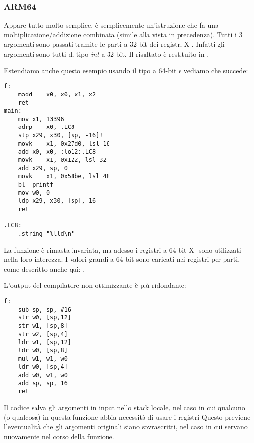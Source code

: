 \subsubsection{ARM64}


Appare tutto molto semplice.
 è semplicemente un'istruzione che fa una moltiplicazione/addizione combinata (simile alla  vista in precedenza).
Tutti i 3 argomenti sono passati tramite le parti a 32-bit dei registri X-.
Infatti gli argomenti sono tutti di tipo \emph{int} a 32-bit.
Il risultato è restituito in .



Estendiamo anche questo esempio usando il tipo  a 64-bit e vediamo che succede:



\begin{lstlisting}[style=customasmARM]
f:
	madd	x0, x0, x1, x2
	ret
main:
	mov	x1, 13396
	adrp	x0, .LC8
	stp	x29, x30, [sp, -16]!
	movk	x1, 0x27d0, lsl 16
	add	x0, x0, :lo12:.LC8
	movk	x1, 0x122, lsl 32
	add	x29, sp, 0
	movk	x1, 0x58be, lsl 48
	bl	printf
	mov	w0, 0
	ldp	x29, x30, [sp], 16
	ret

.LC8:
	.string	"%lld\n"
\end{lstlisting}

La funzione \ttf{} è rimasta invariata, ma adesso i registri a 64-bit X- sono utilizzati nella loro interezza.
I valori grandi a 64-bit sono caricati nei registri per parti, come descritto anche qui: .


L'output del compilatore non ottimizzante è più ridondante:

\begin{lstlisting}[style=customasmARM]
f:
	sub	sp, sp, #16
	str	w0, [sp,12]
	str	w1, [sp,8]
	str	w2, [sp,4]
	ldr	w1, [sp,12]
	ldr	w0, [sp,8]
	mul	w1, w1, w0
	ldr	w0, [sp,4]
	add	w0, w1, w0
	add	sp, sp, 16
	ret
\end{lstlisting}

Il codice salva gli argomenti in input nello stack locale, nel caso in cui qualcuno (o qualcosa) in questa funzione abbia necessità 
di usare i registri  
Questo previene l'eventualità che gli argomenti originali siano sovrascritti, nel caso in cui servano nuovamente nel corso della funzione.

